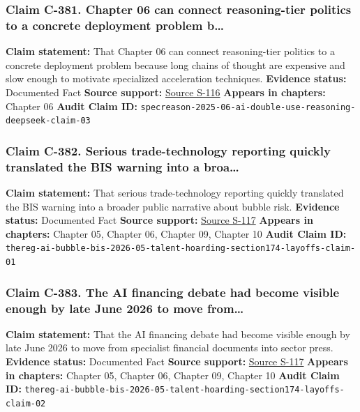 \documentclass[
  american,
  11pt,
  letterpaper,
]{article}
\begin{document}
\subsubsection{Claim C-381. Chapter 06 can connect reasoning-tier
politics to a concrete deployment problem
b\ldots{}}\label{claim-c-381-chapter-06-can-connect-reasoning-tier-politics-to-a-concrete-deployment-problem-b}

\textbf{Claim statement:} That Chapter 06 can connect reasoning-tier
politics to a concrete deployment problem because long chains of thought
are expensive and slow enough to motivate specialized acceleration
techniques. \textbf{Evidence status:} Documented Fact \textbf{Source
support:}
\hyperref[source-s-116-specreason-fast-and-accurate-inference-time-compute-via-speculative-reasoning]{Source
S-116} \textbf{Appears in chapters:} Chapter 06 \textbf{Audit Claim ID:}
\texttt{specreason-2025-06-ai-double-use-reasoning-deepseek-claim-03}

\subsubsection{Claim C-382. Serious trade-technology reporting quickly
translated the BIS warning into a
broa\ldots{}}\label{claim-c-382-serious-trade-technology-reporting-quickly-translated-the-bis-warning-into-a-broa}

\textbf{Claim statement:} That serious trade-technology reporting
quickly translated the BIS warning into a broader public narrative about
bubble risk. \textbf{Evidence status:} Documented Fact \textbf{Source
support:}
\hyperref[source-s-117-how-the-ai-bubble-could-pop-and-take-down-the-global-economy-according-to-the-bis]{Source
S-117} \textbf{Appears in chapters:} Chapter 05, Chapter 06, Chapter 09,
Chapter 10 \textbf{Audit Claim ID:}
\texttt{thereg-ai-bubble-bis-2026-05-talent-hoarding-section174-layoffs-claim-01}

\subsubsection{Claim C-383. The AI financing debate had become visible
enough by late June 2026 to move
from\ldots{}}\label{claim-c-383-the-ai-financing-debate-had-become-visible-enough-by-late-june-2026-to-move-from}

\textbf{Claim statement:} That the AI financing debate had become
visible enough by late June 2026 to move from specialist financial
documents into sector press. \textbf{Evidence status:} Documented Fact
\textbf{Source support:}
\hyperref[source-s-117-how-the-ai-bubble-could-pop-and-take-down-the-global-economy-according-to-the-bis]{Source
S-117} \textbf{Appears in chapters:} Chapter 05, Chapter 06, Chapter 09,
Chapter 10 \textbf{Audit Claim ID:}
\texttt{thereg-ai-bubble-bis-2026-05-talent-hoarding-section174-layoffs-claim-02}
\end{document}
